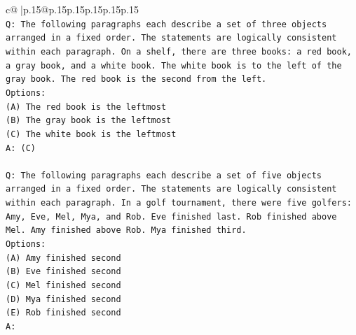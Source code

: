 \documentclass{article}
\begin{document}
{\begin{supertabular}{c@{$\;$}|p{.15\linewidth}@{}p{.15\linewidth}p{.15\linewidth}p{.15\linewidth}p{.15\linewidth}p{.15\linewidth}}
{{{\\ 
\texttt{Q: The following paragraphs each describe a set of three objects arranged in a fixed order. The statements are logically consistent within each paragraph. On a shelf, there are three books: a red book, a gray book, and a white book. The white book is to the left of the gray book. The red book is the second from the left.} \\
\texttt{Options:} \\
\texttt{(A) The red book is the leftmost} \\
\texttt{(B) The gray book is the leftmost} \\
\texttt{(C) The white book is the leftmost} \\
\texttt{A: (C)} \\
\\ 
\texttt{Q: The following paragraphs each describe a set of five objects arranged in a fixed order. The statements are logically consistent within each paragraph. In a golf tournament, there were five golfers: Amy, Eve, Mel, Mya, and Rob. Eve finished last. Rob finished above Mel. Amy finished above Rob. Mya finished third.} \\
\texttt{Options:} \\
\texttt{(A) Amy finished second} \\
\texttt{(B) Eve finished second} \\
\texttt{(C) Mel finished second} \\
\texttt{(D) Mya finished second} \\
\texttt{(E) Rob finished second} \\
\texttt{A:} \\
            }
        }
    }
     \\ \\


\end{supertabular}}
\end{document}
